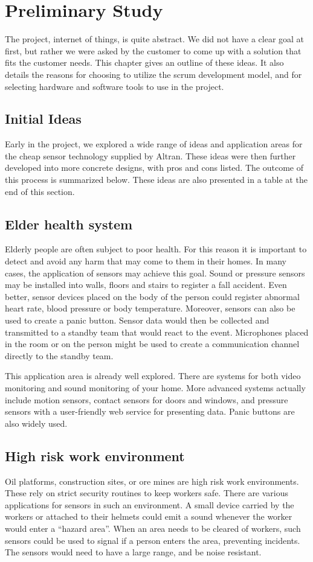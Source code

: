 \documentclass[../document.tex]{subfiles}
\begin{document}
\section{Preliminary Study}
The project, internet of things, is quite abstract. We did not have a clear goal at first, but rather we were asked by the customer to come up with a solution that fits the customer needs. This chapter gives an outline of these ideas. It also details the reasons for choosing to utilize the scrum development model, and for selecting hardware and software tools to use in the project.

\subsection{Initial Ideas}
Early in the project, we explored a wide range of ideas and application areas for the cheap sensor technology supplied by Altran. These ideas were then further developed into more concrete designs, with pros and cons listed. The outcome of this process is summarized below. These ideas are also presented in a table at the end of this section.

\subsection{Elder health system}
Elderly people are often subject to poor health. For this reason it is important to detect and avoid any harm that may come to them in their homes. In many cases, the application of sensors may achieve this goal. Sound or pressure sensors may be installed into walls, floors and stairs to register a fall accident. Even better, sensor devices placed on the body of the person could register abnormal heart rate, blood pressure or body temperature. Moreover, sensors can also be used to create a panic button. Sensor data would then be collected and transmitted to a standby team that would react to the event. Microphones placed in the room or on the person might be used to create a communication channel directly to the standby team.

This application area is already well explored. There are systems for both video monitoring and sound monitoring of your home. More advanced systems actually include motion sensors, contact sensors for doors and windows, and pressure sensors with a user-friendly web service for presenting data. Panic buttons are also widely used.

\subsection{High risk work environment}
Oil platforms, construction sites, or ore mines are high risk work environments. These rely on strict security routines to keep workers safe. There are various applications for sensors in such an environment. A small device carried by the workers or attached to their helmets could emit a sound whenever the worker would enter a ``hazard area''. When an area needs to be cleared of workers, such sensors could be used to signal if a person enters the area, preventing incidents. The sensors would need to have a large range, and be noise resistant.
\end{document}
